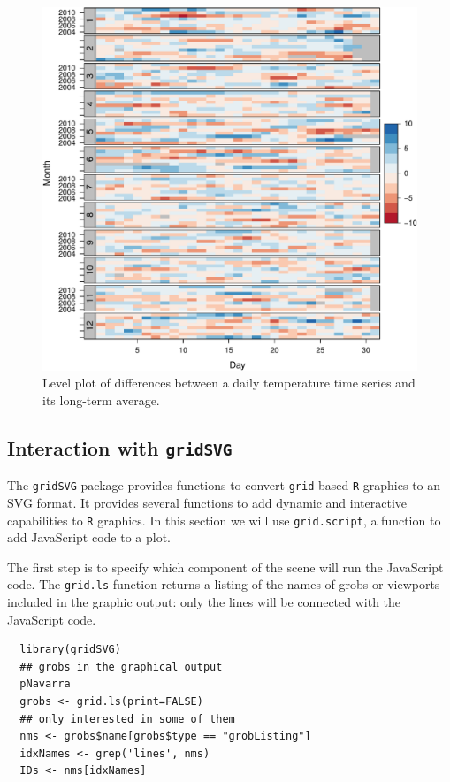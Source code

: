 \documentclass[smallroyalvopaper]{memoir}
\begin{document}
\begin{figure}[htbp]
\centering
\includegraphics[width=.9\linewidth]{figs/diffTa_levelplot.pdf}
\caption{\label{fig:org58fe518}
Level plot of differences between a daily temperature time series and its long-term average.}
\end{figure}


\subsection{\floweroneleft Interaction with \texttt{gridSVG}}
\label{sec:orgca2fb62}
The \texttt{gridSVG} package provides functions to convert \texttt{grid}-based \texttt{R}
graphics to an SVG format. It provides several functions to add
dynamic and interactive capabilities to \texttt{R} graphics. In this section
we will use \texttt{grid.script}, a function to add JavaScript code to a
plot.

The first step is to specify which component of the scene
will run the JavaScript code. The \texttt{grid.ls} function  returns a
listing of the names of grobs or viewports included in the graphic
output: only the lines will be connected with the JavaScript
code. 


\lstset{language=r,label= ,caption= ,captionpos=b,numbers=none}
\begin{lstlisting}
  library(gridSVG)
  ## grobs in the graphical output
  pNavarra
  grobs <- grid.ls(print=FALSE)
  ## only interested in some of them
  nms <- grobs$name[grobs$type == "grobListing"]
  idxNames <- grep('lines', nms)
  IDs <- nms[idxNames]
\end{lstlisting}
\end{document}
